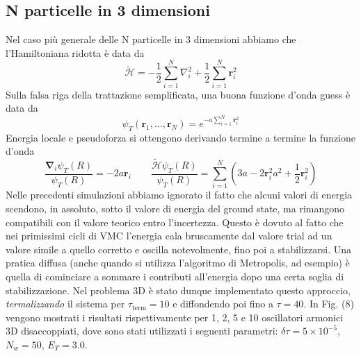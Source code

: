 \documentclass[11pt,a4paper]{article}
\begin{document}
\subsection{N particelle in 3 dimensioni}
Nel caso più generale delle N particelle in 3 dimensioni abbiamo che l'Hamiltoniana ridotta è data da
\begin{equation}
\mathcal{\tilde{H}} = -\frac{1}{2}\sum_{i=1}^N \nabla^2_i + \frac{1}{2}\sum_{i=1}^N\textbf{r}_i^2
\end{equation}
Sulla falsa riga della trattazione semplificata, una buona funzione d'onda guess è data da
\begin{equation}
\psi_T(\textbf{r}_1, \ldots, \textbf{r}_N) = e^{-a\sum_{i=1}^N \textbf{r}_i^2}
\end{equation}
Energia locale e pseudoforza si ottengono derivando termine a termine la funzione d'onda
\begin{equation}
\frac{\boldsymbol{\nabla}_i\psi_T(R)}{\psi_T(R)} = -2a\textbf{r}_i \qquad \frac{\mathcal{\tilde{H}}\psi_T(R)}{\psi_T(R)} = \sum_{i=1}^N (3a - 2\textbf{r}_i^2a^2 + \frac{1}{2}\textbf{r}_i^2)
\end{equation}
Nelle precedenti simulazioni abbiamo ignorato il fatto che alcuni valori di energia scendono, in assoluto, sotto il valore di energia del ground state, ma rimangono compatibili con il valore teorico entro l'incertezza. Questo è dovuto al fatto che nei primissimi cicli di VMC l'energia cala bruscamente dal valore trial ad un valore simile a quello corretto e oscilla notevolmente, fino poi a stabilizzarsi. Una pratica diffusa (anche quando si utilizza l'algoritmo di Metropolis, ad esempio) è quella di cominciare a sommare i contributi all'energia dopo una certa soglia di stabilizzazione. Nel problema 3D è stato dunque implementato questo approccio, \emph{termalizzando} il sistema per $\tau_{\text{term}} = 10$ e diffondendo poi fino a $\tau=40$. In Fig. (8) vengono mostrati i risultati rispettivamente per 1, 2, 5 e 10 oscillatori armonici 3D disaccoppiati, dove sono stati utilizzati i seguenti parametri: $\delta \tau = 5\times 10^{-5}$, $N_w=50$, $E_T = 3.0$. 
\end{document}
